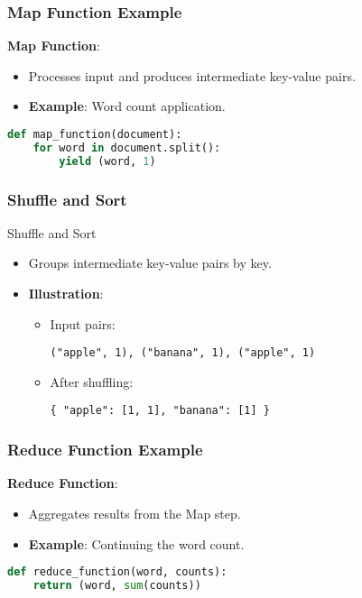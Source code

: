 \documentclass[aspectratio=169]{beamer}
\begin{document}
\begin{frame}[fragile]
    \frametitle{Map Function Example}
    \textbf{Map Function}:
    \begin{itemize}
        \item Processes input and produces intermediate key-value pairs.
        \item \textbf{Example}: Word count application.
    \end{itemize}
    
    \begin{lstlisting}[language=Python]
def map_function(document):
    for word in document.split():
        yield (word, 1)
    \end{lstlisting}
\end{frame}

\begin{frame}
    \frametitle{Shuffle and Sort}
    \begin{block}{Shuffle and Sort}
        \begin{itemize}
            \item Groups intermediate key-value pairs by key.
            \item \textbf{Illustration}:
            \begin{itemize}
                \item Input pairs: 
                \begin{lstlisting}
("apple", 1), ("banana", 1), ("apple", 1)
                \end{lstlisting}
                \item After shuffling: 
                \begin{lstlisting}
{ "apple": [1, 1], "banana": [1] }
                \end{lstlisting}
            \end{itemize}
        \end{itemize}
    \end{block}
\end{frame}

\begin{frame}[fragile]
    \frametitle{Reduce Function Example}
    \textbf{Reduce Function}:
    \begin{itemize}
        \item Aggregates results from the Map step.
        \item \textbf{Example}: Continuing the word count.
    \end{itemize}
    
    \begin{lstlisting}[language=Python]
def reduce_function(word, counts):
    return (word, sum(counts))
    \end{lstlisting}
\end{frame}
\end{document}
